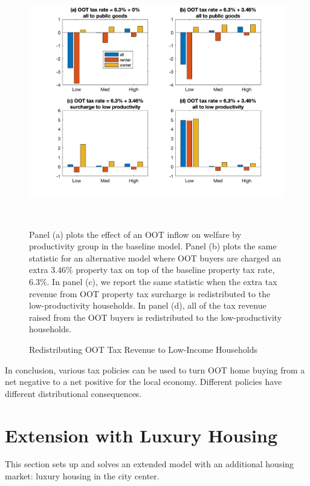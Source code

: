 \documentclass[letterpaper,12pt,dvipsnames,usenames]{article}
\theoremstyle{definition}
\begin{document}
\begin{spacing}{1.25}
{\begin{figure}[h!]
\begin{center}
\caption{Redistributing OOT Tax Revenue to Low-Income Households}\label{fig:transferstolowinc}
\includegraphics[width=6in,height=4.0in]{../Figures/welfare_by_productivity_baseline_taxtolow2}
\end{center}
\begin{minipage}{\textwidth}\tiny
    Panel (a) plots the effect of an OOT inflow on welfare by productivity group in the baseline model. Panel (b) plots the same statistic for an alternative model where OOT buyers are charged an extra 3.46\% property tax on top of the baseline property tax rate, 6.3\%. In panel (c), we report the same statistic when the extra tax revenue from OOT property tax surcharge is redistributed to the low-productivity households. In panel (d), all of the tax revenue raised from the OOT buyers is redistributed to the low-productivity households.
    \end{minipage}
\end{figure}

In conclusion, various tax policies can be used to turn OOT home buying from a net negative to a net positive for the local economy. Different policies have different distributional consequences.

\section{Extension with Luxury Housing}

This section sets up and solves an extended model with an additional housing market: luxury housing in the city center.

}
\end{spacing}
\end{document}
